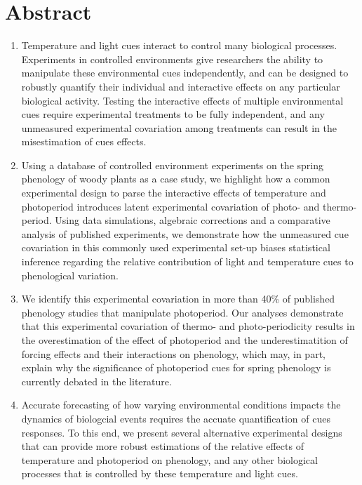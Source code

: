 \documentclass[11pt]{article}
\begin{document}
\section*{Abstract}
\begin{enumerate}
\item Temperature and light cues interact to control many biological processes. Experiments in controlled environments give researchers the ability to manipulate these environmental cues independently, and can be designed to robustly quantify their individual and interactive effects on any particular biological activity. Testing the interactive effects of multiple environmental cues require experimental treatments to be fully independent, and any unmeasured experimental covariation among treatments can result in the misestimation of cues effects. 

\item  Using a database of controlled environment experiments on the spring phenology of woody plants as a case study, we highlight how a common experimental design to parse the interactive effects of temperature and photoperiod introduces latent experimental covariation of photo- and thermo-period. Using data simulations, algebraic corrections  and a comparative analysis of published experiments, we demonstrate how the unmeasured cue covariation in this commonly used experimental set-up biases statistical inference regarding the relative contribution of light and temperature cues to phenological variation.

\item We identify this experimental covariation in more than 40\% of published phenology studies that manipulate photoperiod. Our analyses demonstrate that this experimental covariation of thermo- and photo-periodicity results in the overestimation of the effect of photoperiod and the underestimatition of forcing effects and their interactions on phenology, which may, in part, explain why the significance of photoperiod cues for spring phenology is currently debated in the literature.

\item Accurate forecasting of how varying environmental conditions impacts the dynamics of biologcial events requires the accuate quantification of cues responses. To this end, we present several alternative experimental designs that can provide more robust estimations of the relative effects of temperature and photoperiod on phenology, and any other biological processes that is controlled by these temperature and light cues.
\end{enumerate}
\end{document}

